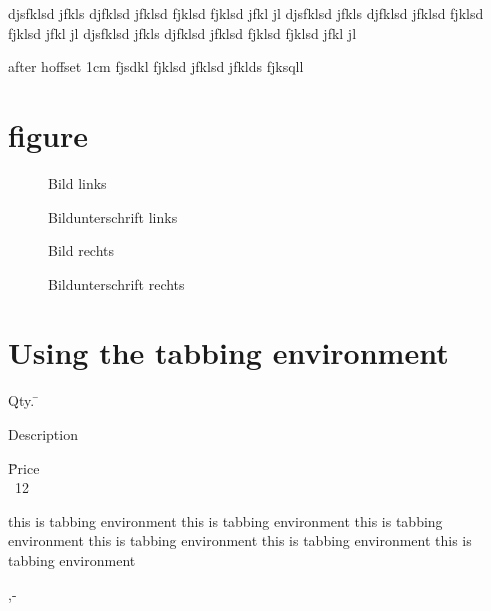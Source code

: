 \documentclass[a4paper]{report}
\begin{document}
 djsfklsd jfkls djfklsd jfklsd fjklsd fjklsd jfkl jl
 djsfklsd jfkls djfklsd jfklsd fjklsd fjklsd jfkl jl
 djsfklsd jfkls djfklsd jfklsd fjklsd fjklsd jfkl jl


\setlength{\hoffset}{1cm}
after  hoffset 1cm
fjsdkl fjklsd jfklsd jfklds fjksqll




\section*{figure}


\begin{figure}
\begin{minipage}[b]{.4\linewidth} %
Bild links
\caption{Bildunterschrift links}
\end{minipage}
\hspace{.1\linewidth}%
\begin{minipage}[b]{.4\linewidth} %
Bild rechts
\caption{Bildunterschrift rechts}
\end{minipage}
\end{figure}



\section*{Using the tabbing environment}


\begin{tabbing}
Qty. \= \parbox{5cm}{Description} \= Price \\\
12 \>
\parbox[t]{5cm}{
this is tabbing environment
this is tabbing environment
this is tabbing environment
this is tabbing environment
this is tabbing environment
this is tabbing environment
}
\>
,-
\end{tabbing}
\end{document}
